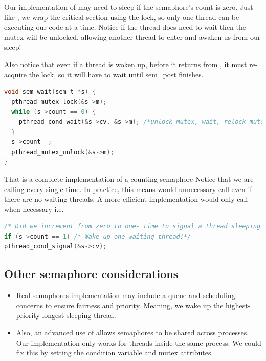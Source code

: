 Our implementation of  may need to sleep if the semaphore's count is zero.
Just like , we wrap the critical section using the lock, so only one thread can be executing our code at a time.
Notice if the thread does need to wait then the mutex will be unlocked, allowing another thread to enter  and awaken us from our sleep!

Also notice that even if a thread is woken up, before it returns from , it must re-acquire the lock, so it will have to wait until sem\_post finishes.

\begin{lstlisting}[language=C]
void sem_wait(sem_t *s) {
  pthread_mutex_lock(&s->m);
  while (s->count == 0) {
    pthread_cond_wait(&s->cv, &s->m); /*unlock mutex, wait, relock mutex*/
  }
  s->count--;
  pthread_mutex_unlock(&s->m);
}
\end{lstlisting}

That is a complete implementation of a counting semaphore
Notice that we are calling  every single time.
In practice, this means  would unnecessary call  even if there are no waiting threads.
A more efficient implementation would only call  when necessary i.e.

\begin{lstlisting}[language=C]
/* Did we increment from zero to one- time to signal a thread sleeping inside sem_post */
if (s->count == 1) /* Wake up one waiting thread!*/
pthread_cond_signal(&s->cv);
\end{lstlisting}

\subsection{Other semaphore considerations}

\begin{itemize}
\tightlist
\item
  Real semaphores implementation may include a queue and scheduling concerns to ensure fairness and priority.
  Meaning, we wake up the highest-priority longest sleeping thread.
\item
  Also, an advanced use of  allows semaphores to be shared across processes.
  Our implementation only works for threads inside the same process.
  We could fix this by setting the condition variable and mutex attributes.
\end{itemize}

